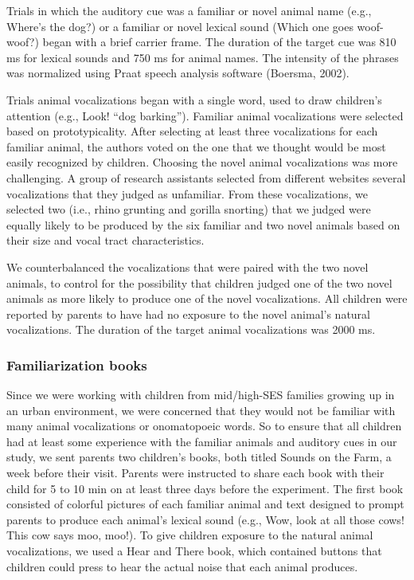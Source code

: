 \documentclass[english,floatsintext,man]{apa6}
\newcounter{author}
\theoremstyle{definition}
\theoremstyle{definition}
\theoremstyle{definition}
\theoremstyle{remark}
\begin{document}
Trials in which the auditory cue was a familiar or novel animal name
(e.g., Where's the dog?) or a familiar or novel lexical sound (Which one
goes woof-woof?) began with a brief carrier frame. The duration of the
target cue was 810 ms for lexical sounds and 750 ms for animal names.
The intensity of the phrases was normalized using Praat speech analysis
software (Boersma, 2002).

Trials animal vocalizations began with a single word, used to draw
children's attention (e.g., Look! \enquote{dog barking}). Familiar
animal vocalizations were selected based on prototypicality. After
selecting at least three vocalizations for each familiar animal, the
authors voted on the one that we thought would be most easily recognized
by children. Choosing the novel animal vocalizations was more
challenging. A group of research assistants selected from different
websites several vocalizations that they judged as unfamiliar. From
these vocalizations, we selected two (i.e., rhino grunting and gorilla
snorting) that we judged were equally likely to be produced by the six
familiar and two novel animals based on their size and vocal tract
characteristics.

We counterbalanced the vocalizations that were paired with the two novel
animals, to control for the possibility that children judged one of the
two novel animals as more likely to produce one of the novel
vocalizations. All children were reported by parents to have had no
exposure to the novel animal's natural vocalizations. The duration of
the target animal vocalizations was 2000 ms.

\hypertarget{familiarization-books}{%
\subsubsection{Familiarization books}\label{familiarization-books}}

Since we were working with children from mid/high-SES families growing
up in an urban environment, we were concerned that they would not be
familiar with many animal vocalizations or onomatopoeic words. So to
ensure that all children had at least some experience with the familiar
animals and auditory cues in our study, we sent parents two children's
books, both titled Sounds on the Farm, a week before their visit.
Parents were instructed to share each book with their child for 5 to 10
min on at least three days before the experiment. The first book
consisted of colorful pictures of each familiar animal and text designed
to prompt parents to produce each animal's lexical sound (e.g., Wow,
look at all those cows! This cow says moo, moo!). To give children
exposure to the natural animal vocalizations, we used a Hear and There
book, which contained buttons that children could press to hear the
actual noise that each animal produces.
\end{document}
